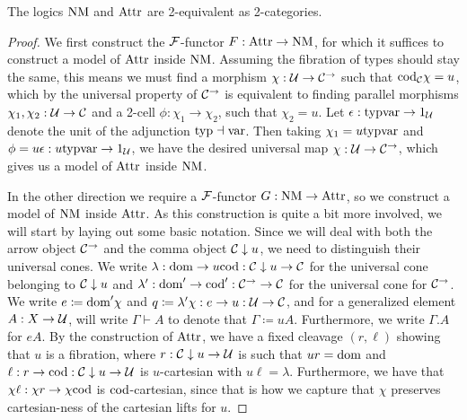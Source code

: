\documentclass[../thesis.tex]{subfiles}
\begin{document}
\begin{proposition}
  The logics ${\mathrm{NM}}$ and ${\mathrm{Attr}}$ are 2-equivalent as 2-categories.
\end{proposition}
\begin{proof}
  We first construct the ${\mathcal{F}}$-functor $F : {\mathrm{Attr}} \to {\mathrm{NM}}$, for which it suffices to construct a model of
  ${\mathrm{Attr}}$ inside ${\mathrm{NM}}$. Assuming the fibration of types should stay the same, this means we must find a
  morphism $\chi : {\mathcal{U}} \to {\mathcal{C}}^\to$ such that ${\mathrm{cod}}_{\mathcal{C}}\chi = u$, which by the universal property of
  ${\mathcal{C}}^\to$ is equivalent to finding parallel morphisms $\chi_1,\chi_2 : {\mathcal{U}} \to {\mathcal{C}}$ and a 2-cell $\phi
  : \chi_1 \to \chi_2$, such that $\chi_2 = u$. Let $\epsilon : {{\mathrm{typ}}}{{\mathrm{var}}} \to 1_{\mathcal{U}}$ denote the unit
  of the adjunction ${{\mathrm{typ}}} \dashv {{\mathrm{var}}}$. Then taking $\chi_1 = u{{\mathrm{typ}}}{{\mathrm{var}}}$ and $\phi = u\epsilon
  : u{{\mathrm{typ}}}{{\mathrm{var}}} \to 1_{\mathcal{U}}$, we have the desired universal map $\chi : {\mathcal{U}} \to {\mathcal{C}}^\to$, which gives
  us a model of ${\mathrm{Attr}}$ inside ${\mathrm{NM}}$. 

  In the other direction we require a ${\mathcal{F}}$-functor $G : {\mathrm{NM}} \to {\mathrm{Attr}}$, so we construct a model of ${\mathrm{NM}}$
  inside ${\mathrm{Attr}}$. As this construction is quite a bit more involved, we will start by laying out some basic
  notation. Since we will deal with both the arrow object ${\mathcal{C}}^\to$ and the comma object ${\mathcal{C}} \mathrel{\downarrow} u$, we
  need to distinguish their universal cones. We write $\lambda : {\mathrm{dom}} \to u{\mathrm{cod}} : {\mathcal{C}} \mathrel{\downarrow} u \to {\mathcal{C}}$ for
  the universal cone belonging to ${\mathcal{C}}\mathrel{\downarrow} u$ and $\lambda' : {\mathrm{dom}}' \to {\mathrm{cod}}' : {\mathcal{C}}^\to \to {\mathcal{C}}$ for the
  universal cone for ${\mathcal{C}}^\to$. We write $e \coloneq {\mathrm{dom}}'\chi$ and $q \coloneq \lambda' \chi : e \to u :
  {\mathcal{U}} \to {\mathcal{C}}$, and for a generalized element $A : X \to {\mathcal{U}}$, will write $\Gamma \vdash A$ to denote that
  $\Gamma \coloneq uA$. Furthermore, we write $\Gamma.A$ for $eA$. By the construction of ${\mathrm{Attr}}$, we have
  a fixed cleavage $(r,\ell)$ showing that $u$ is a fibration, where $r : {\mathcal{C}} \mathrel{\downarrow} u \to {\mathcal{U}}$ is such
  that $ur = {\mathrm{dom}}$ and $\ell : r \to {\mathrm{cod}} : {\mathcal{C}}\mathrel{\downarrow} u \to {\mathcal{U}}$ is $u$-cartesian with $u\ell = \lambda$.
  Furthermore, we have that $\chi\ell : \chi r \to \chi{\mathrm{cod}}$ is ${\mathrm{cod}}$-cartesian, since that is how we capture
  that $\chi$ preserves cartesian-ness of the cartesian lifts for $u$.


\end{proof}
\end{document}
